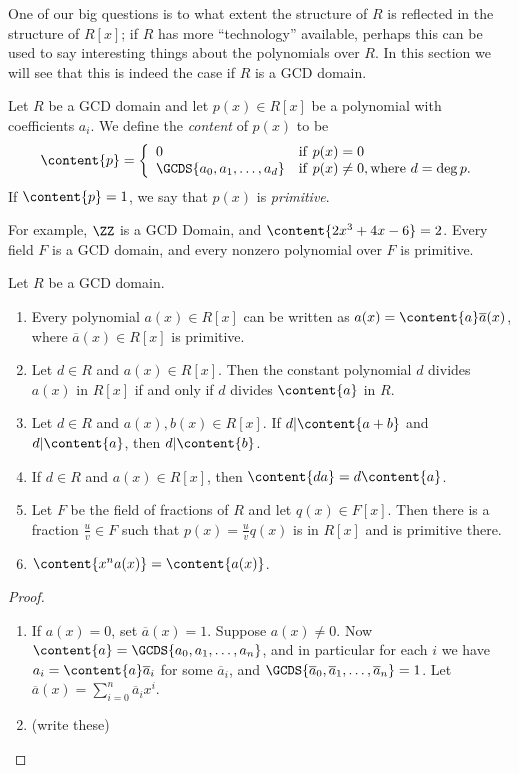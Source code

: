 \documentclass{article}
\begin{document}

One of our big questions is to what extent the structure of $R$ is reflected in the structure of $R[x]$; if $R$ has more ``technology'' available, perhaps this can be used to say interesting things about the polynomials over $R$. In this section we will see that this is indeed the case if $R$ is a GCD domain.

\begin{dfn}
Let $R$ be a GCD domain and let $p(x) \in R[x]$ be a polynomial with coefficients $a_i$. We define the \emph{content} of $p(x)$ to be \[ \content{p} = \left\{ \begin{array}{ll} 0 & \mathrm{if}\ p(x) = 0 \\ \GCDS{a_0,a_1,\ldots,a_d} & \mathrm{if}\ p(x) \neq 0, \mathrm{where}\ d = \deg{p}. \end{array} \right. \] If $\content{p} = 1$, we say that $p(x)$ is \emph{primitive}.
\end{dfn}

For example, $\ZZ$ is a GCD Domain, and $\content{2x^3 + 4x - 6} = 2$. Every field $F$ is a GCD domain, and every nonzero polynomial over $F$ is primitive.

\begin{prop}
Let $R$ be a GCD domain.
\begin{enumerate}
\item Every polynomial $a(x) \in R[x]$ can be written as $a(x) = \content{a} \overline{a}(x)$, where $\overline{a}(x) \in R[x]$ is primitive.
\item Let $d \in R$ and $a(x) \in R[x]$. Then the constant polynomial $d$ divides $a(x)$ in $R[x]$ if and only if $d$ divides $\content{a}$ in $R$.
\item Let $d \in R$ and $a(x), b(x) \in R[x]$. If $d|\content{a+b}$ and $d|\content{a}$, then $d|\content{b}$.
\item If $d \in R$ and $a(x) \in R[x]$, then $\content{da} = d\content{a}$.
\item Let $F$ be the field of fractions of $R$ and let $q(x) \in F[x]$. Then there is a fraction $\frac{u}{v} \in F$ such that $p(x) = \frac{u}{v}q(x)$ is in $R[x]$ and is primitive there.

\item $\content{x^n a(x)} = \content{a(x)}$.
\end{enumerate}
\end{prop}

\begin{proof} \mbox{}
\begin{enumerate}
\item If $a(x) = 0$, set $\overline{a}(x) = 1$. Suppose $a(x) \neq 0$. Now $\content{a} = \GCDS{a_0,a_1,\ldots,a_n}$, and in particular for each $i$ we have $a_i = \content{a}\overline{a}_i$ for some $\overline{a}_i$, and $\GCDS{\overline{a}_0, \overline{a}_1, \ldots, \overline{a}_n} = 1$. Let $\overline{a}(x) = \sum_{i=0}^n \overline{a}_i x^i$.

\item (write these)
\end{enumerate}
\end{proof}
\end{document}
